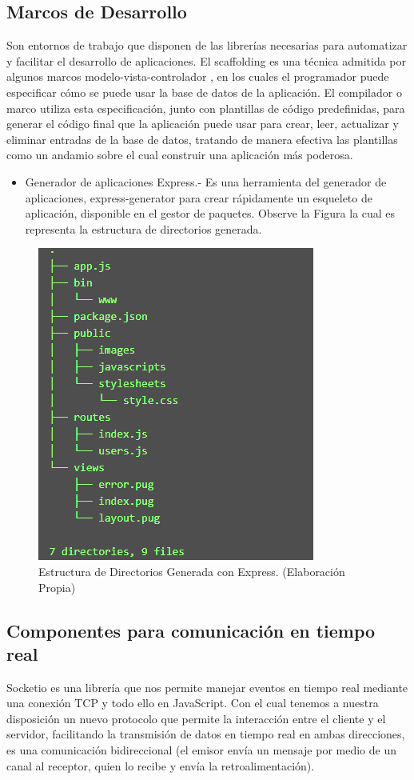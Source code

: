 \documentclass[11pt,letterpaper]{report}
\begin{document}
		\subsection{Marcos de Desarrollo}
		Son entornos de trabajo que disponen de las librerías necesarias para automatizar y facilitar el desarrollo de aplicaciones.
		El scaffolding es una técnica admitida por algunos marcos modelo-vista-controlador , en los cuales el programador puede especificar cómo se puede usar la base de datos de la aplicación. El compilador o marco utiliza esta especificación, junto con plantillas de código predefinidas, para generar el código final que la aplicación puede usar para crear, leer, actualizar y eliminar entradas de la base de datos, tratando de manera efectiva las plantillas como un andamio  sobre el cual construir una aplicación más poderosa\citep{quintana2004scaffolding}.
		\begin{itemize}
		\item Generador de aplicaciones Express.- Es una herramienta del generador de aplicaciones, express-generator para crear rápidamente un esqueleto de aplicación, disponible en el gestor de paquetes. Observe la Figura  la cual es representa la estructura de directorios generada.
		\end{itemize}
		\begin{figure}[ht]
		\centering
		\includegraphics[scale=0.7]{imagenes/express2.png}
		\caption{Estructura de Directorios Generada con Express. (Elaboración Propia)}
		\label{estructuraExpress} 
		\end{figure}
		\subsection{Componentes para comunicación en tiempo real}
		Socketio es una librería que nos permite manejar eventos en tiempo real mediante una conexión TCP y todo ello en JavaScript. Con el cual  tenemos a nuestra disposición un nuevo protocolo que permite la interacción entre el cliente y el servidor, facilitando la transmisión de datos en tiempo real en ambas direcciones, es una comunicación bidireccional (el emisor envía un mensaje por medio de un canal al receptor, quien lo recibe y envía la retroalimentación)\citep{rai2013socket}.
\end{document}
